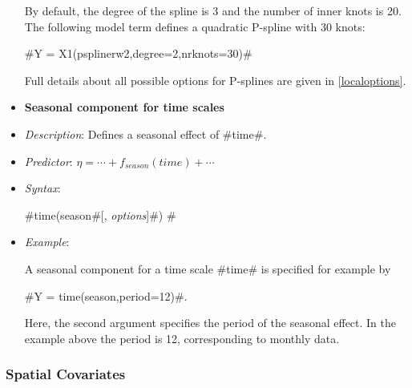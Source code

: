 \begin{itemize}
By default, the degree of the spline is 3 and the number of inner
knots is 20. The following model term defines a quadratic P-spline
with 30 knots:

#Y = X1(psplinerw2,degree=2,nrknots=30)#

Full details about all possible options for P-splines are given in
\autoref{localoptions}.

\item[] {\bf\sffamily Seasonal component for time scales}

\item[] {\em Description}: Defines a seasonal effect of #time#.
\item[] {\em Predictor}: $\eta =  \cdots + f_{season}(time) +
\cdots $ \item[] {\em Syntax}:

#time(season#[, {\em options}]#) #
\item[] {\em Example}:

A seasonal component for a time scale #time# is specified for
example by

#Y = time(season,period=12)#.

Here, the second argument specifies the period of the seasonal
effect. In the example above the period is 12, corresponding to
monthly data.
\end{itemize}


\subsubsection*{Spatial Covariates}

